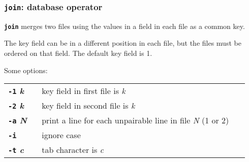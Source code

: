 \begin{frame}[shrink]
\frametitle{\textbf{\tt{join}}: database operator}

\textbf{\tt{join}} merges two files using the values in a field
in each file as a common key.

The key field can be in a different position in each file,
but the files must be ordered on that field.
The default key field is 1.

Some options:


\begin{center}
\begin{tabular}{lll}

  \begin{minipage}{1cm}{\bf{\textbf{\tt{-1}} {\it{k}}}} ~\end{minipage}
   & \begin{minipage}{18cm}key field in first file is {\it{k}}~\end{minipage}
\\[1ex]

  \begin{minipage}{1cm}{\bf{\textbf{\tt{-2}} {\it{k}}}} ~\end{minipage}
   & \begin{minipage}{18cm}key field in second file is {\it{k}}~\end{minipage}
\\[1ex]

  \begin{minipage}{1cm}{\bf{\textbf{\tt{-a}} {\it{N}}}} ~\end{minipage}
   & \begin{minipage}{18cm}print a line for each unpairable line in file {\it{N}} (1 or 2)~\end{minipage}
\\[1ex]

  \begin{minipage}{1cm}{\bf{\textbf{\tt{-i}}}} ~\end{minipage}
   & \begin{minipage}{18cm}ignore case~\end{minipage}
\\[1ex]

  \begin{minipage}{1cm}{\bf{\textbf{\tt{-t}} {\it{c}}}} ~\end{minipage}
   & \begin{minipage}{18cm}tab character is {\it{c}}~\end{minipage}
\\[1ex]
\end{tabular}
\end{center}

\end{frame}

